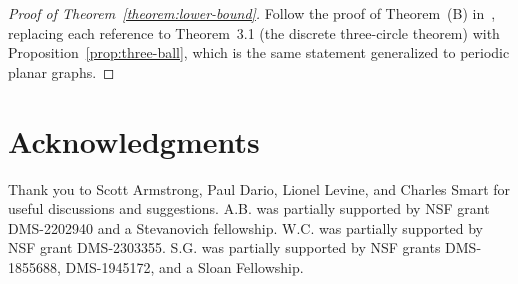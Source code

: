\documentclass{daj}
\begin{document}
\begin{proof}[Proof of Theorem~\ref{theorem:lower-bound}]
	Follow the proof of Theorem~(B) in~\cite{buhovsky2022discrete}, replacing each reference to Theorem~3.1 (the discrete three-circle theorem) with Proposition~\ref{prop:three-ball}, which is the same statement generalized to periodic planar graphs.
\end{proof}


\section*{Acknowledgments}
Thank you to Scott Armstrong, Paul Dario, Lionel Levine, and Charles Smart for useful discussions and suggestions.
A.B. was partially supported by NSF grant DMS-2202940 and a Stevanovich fellowship.
W.C. was partially supported by NSF grant DMS-2303355.
S.G. was partially supported by NSF grants DMS-1855688,
DMS-1945172, and a Sloan Fellowship.


{
	
	
}
\end{document}
